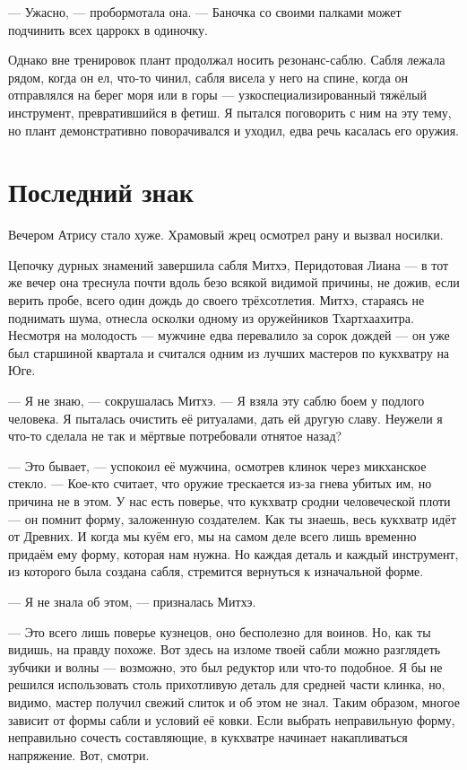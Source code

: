 --- Ужасно, --- пробормотала она.
--- Баночка со своими палками может подчинить всех царрокх в одиночку.

Однако вне тренировок плант продолжал носить резонанс-саблю.
Сабля лежала рядом, когда он ел, что-то чинил, сабля висела у него на спине, когда он отправлялся на берег моря или в горы --- узкоспециализированный тяжёлый инструмент, превратившийся в фетиш.
Я пытался поговорить с ним на эту тему, но плант демонстративно поворачивался и уходил, едва речь касалась его оружия.

\section{Последний знак}

Вечером Атрису стало хуже.
Храмовый жрец осмотрел рану и вызвал носилки.

Цепочку дурных знамений завершила сабля Митхэ, Перидотовая Лиана --- в тот же вечер она треснула почти вдоль безо всякой видимой причины, не дожив, если верить пробе, всего один дождь до своего трёхсотлетия.
Митхэ, стараясь не поднимать шума, отнесла осколки одному из оружейников Тхартхаахитра.
Несмотря на молодость --- мужчине едва перевалило за сорок дождей --- он уже был старшиной квартала и считался одним из лучших мастеров по кукхватру на Юге.

--- Я не знаю, --- сокрушалась Митхэ.
--- Я взяла эту саблю боем у подлого человека.
Я пыталась очистить её ритуалами, дать ей другую славу.
Неужели я что-то сделала не так и мёртвые потребовали отнятое назад?

--- Это бывает, --- успокоил её мужчина, осмотрев клинок через микханское стекло.
--- Кое-кто считает, что оружие трескается из-за гнева убитых им, но причина не в этом.
У нас есть поверье, что кукхватр сродни человеческой плоти --- он помнит форму, заложенную создателем.
Как ты знаешь, весь кукхватр идёт от Древних.
И когда мы куём его, мы на самом деле всего лишь временно придаём ему форму, которая нам нужна.
Но каждая деталь и каждый инструмент, из которого была создана сабля, стремится вернуться к изначальной форме.

--- Я не знала об этом, --- призналась Митхэ.

--- Это всего лишь поверье кузнецов, оно бесполезно для воинов.
Но, как ты видишь, на правду похоже.
Вот здесь на изломе твоей сабли можно разглядеть зубчики и волны --- возможно, это был редуктор или что-то подобное.
Я бы не решился использовать столь прихотливую деталь для средней части клинка, но, видимо, мастер получил свежий слиток и об этом не знал.
Таким образом, многое зависит от формы сабли и условий её ковки.
Если выбрать неправильную форму, неправильно сочесть составляющие, в кукхватре начинает накапливаться напряжение.
Вот, смотри.

